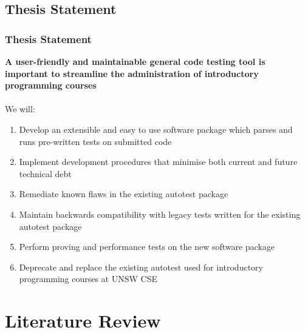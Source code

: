\documentclass[xcolor]{beamer}
\begin{document}
\subsection{Thesis Statement}
\begin{frame}
	\frametitle{Thesis Statement}
	\textbf{A user-friendly and maintainable general code testing tool is important to streamline the administration of introductory programming courses}
	\\~\\
		\pause
	We will:
		\pause
	\begin{enumerate}
		\item Develop an extensible and easy to use software package which parses and runs pre-written tests on submitted code
			\pause
		\item Implement development procedures that minimise both current and future technical debt
			\pause
		\item Remediate known flaws in the existing autotest package
			\pause
		\item Maintain backwards compatibility with legacy tests written for the existing autotest package
			\pause
		\item Perform proving and performance tests on the new software package
			\pause
		\item Deprecate and replace the existing autotest used for introductory programming courses at UNSW CSE
	\end{enumerate}
\end{frame}

\section{Literature Review}
\end{document}
